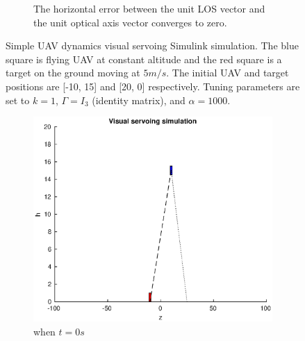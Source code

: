 \begin{figure}
\begin{subfigure}[b]{0.8\linewidth}
		\caption{The horizontal error between the unit LOS vector and the unit optical axis vector converges to zero.}
	\end{subfigure}	
	\caption{Simple UAV dynamics visual servoing Simulink simulation. The blue square is flying UAV at constant altitude and the red square is a target on the ground moving at $5m/s$. The initial UAV and target positions are [-10, 15] and [20, 0] respectively. Tuning parameters are set to $k=1$, $\Gamma=I_3$ (identity matrix), and $\alpha=1000$.}
	\label{simple_simulation}
\end{figure}

\begin{figure}
	\centering
	\begin{subfigure}[b]{0.45\linewidth}
		\includegraphics[width=\textwidth]{images/chapter4/another_simple_zero}
		\caption{when $t=0s$}
	\end{subfigure}
	~ %
	\begin{subfigure}[b]{0.45\linewidth}

\end{subfigure}
\end{figure}
